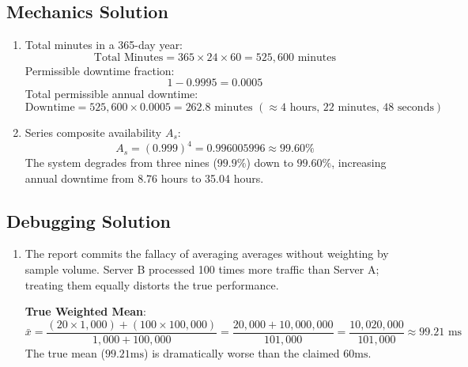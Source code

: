 \subsection*{Mechanics Solution}
\begin{enumerate}[leftmargin=18pt]
  \item Total minutes in a 365-day year:
  $$\text{Total Minutes} = 365 \times 24 \times 60 = 525,600 \text{ minutes}$$
  Permissible downtime fraction:
  $$1 - 0.9995 = 0.0005$$
  Total permissible annual downtime:
  $$\text{Downtime} = 525,600 \times 0.0005 = 262.8 \text{ minutes } (\approx 4\text{ hours, } 22\text{ minutes, } 48\text{ seconds})$$
  
  \item Series composite availability $A_s$:
  $$A_s = (0.999)^4 = 0.996005996 \approx 99.60\%$$
  The system degrades from three nines ($99.9\%$) down to $99.60\%$, increasing annual downtime from 8.76 hours to 35.04 hours.
\end{enumerate}

\subsection*{Debugging Solution}
\begin{enumerate}[leftmargin=18pt]
  \item The report commits the fallacy of averaging averages without weighting by sample volume. Server B processed 100 times more traffic than Server A; treating them equally distorts the true performance.
  
  \textbf{True Weighted Mean}:
  $$\bar{x} = \frac{(20 \times 1,000) + (100 \times 100,000)}{1,000 + 100,000} = \frac{20,000 + 10,000,000}{101,000} = \frac{10,020,000}{101,000} \approx 99.21 \text{ ms}$$
  The true mean ($99.21\text{ms}$) is dramatically worse than the claimed $60\text{ms}$.
\end{enumerate}

